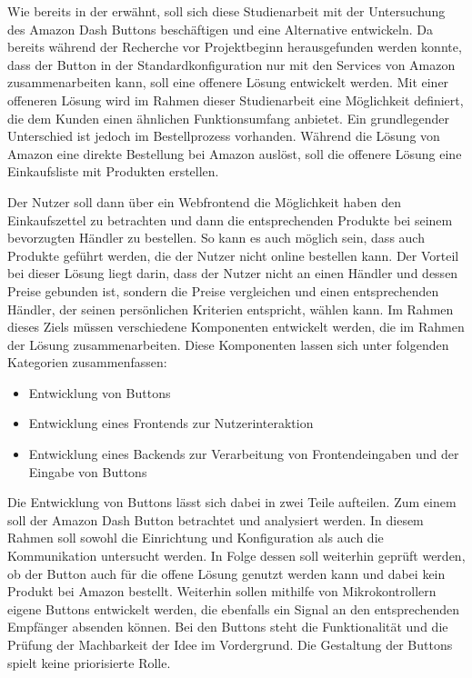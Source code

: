 Wie bereits in der  erwähnt, soll sich diese Studienarbeit mit der Untersuchung des Amazon Dash Buttons beschäftigen und eine Alternative entwickeln. Da bereits während der Recherche vor Projektbeginn herausgefunden werden konnte, dass der Button in der Standardkonfiguration nur mit den Services von Amazon zusammenarbeiten kann, soll eine offenere Lösung entwickelt werden. Mit einer offeneren Lösung wird im Rahmen dieser Studienarbeit eine Möglichkeit definiert, die dem Kunden einen ähnlichen Funktionsumfang anbietet. Ein grundlegender Unterschied ist jedoch im Bestellprozess vorhanden. Während die Lösung von Amazon eine direkte Bestellung bei Amazon auslöst, soll die offenere Lösung eine Einkaufsliste mit Produkten erstellen. 

Der Nutzer soll dann über ein Webfrontend die Möglichkeit haben den Einkaufszettel zu betrachten und dann die entsprechenden Produkte bei seinem bevorzugten Händler zu bestellen. So kann es auch möglich sein, dass auch Produkte geführt werden, die der Nutzer nicht online bestellen kann. Der Vorteil bei dieser Lösung liegt darin, dass der Nutzer nicht an einen Händler und dessen Preise gebunden ist, sondern die Preise vergleichen und einen entsprechenden Händler, der seinen persönlichen Kriterien entspricht, wählen kann. 
Im Rahmen dieses Ziels müssen verschiedene Komponenten entwickelt werden, die im Rahmen der Lösung zusammenarbeiten. Diese Komponenten lassen sich unter folgenden Kategorien zusammenfassen:
\begin{itemize}
\item Entwicklung von Buttons 
\item Entwicklung eines Frontends zur Nutzerinteraktion
\item Entwicklung eines Backends zur Verarbeitung von Frontendeingaben und der Eingabe von Buttons 
\end{itemize}
Die Entwicklung von Buttons lässt sich dabei in zwei Teile aufteilen. Zum einem soll der Amazon Dash Button betrachtet und analysiert werden. In diesem Rahmen soll sowohl die Einrichtung und Konfiguration als auch die Kommunikation untersucht werden. In Folge dessen soll weiterhin geprüft werden, ob der Button auch für die offene Lösung genutzt werden kann und dabei kein Produkt bei Amazon bestellt. Weiterhin sollen mithilfe von Mikrokontrollern eigene Buttons entwickelt werden, die ebenfalls ein Signal an den entsprechenden Empfänger absenden können. Bei den Buttons steht die Funktionalität und die Prüfung der Machbarkeit der Idee im Vordergrund. Die Gestaltung der Buttons spielt keine priorisierte Rolle. 

